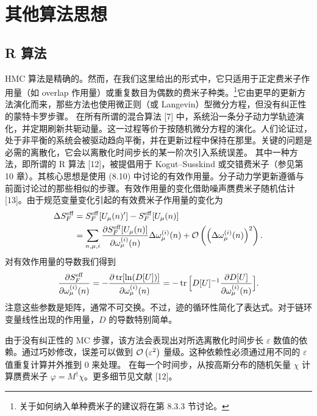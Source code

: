 \section{其他算法思想}

\subsection{R 算法}

HMC 算法是精确的。然而，在我们这里给出的形式中，它只适用于正定费米子作用量（如 overlap 作用量）或重复数目为偶数的费米子种类。\footnote{关于如何纳入单种费米子的建议将在第 8.3.3 节讨论。}它由更早的更新方法演化而来，那些方法也使用微正则（或 Langevin）型微分方程，但没有纠正性的蒙特卡罗步骤。
在所有所谓的混合算法 [7] 中，系统沿一条分子动力学轨迹演化，并定期刷新共轭动量。这一过程等价于按随机微分方程的演化。人们论证过，处于非平衡的系统会被驱动趋向平衡，并在更新过程中保持在那里。关键的问题是必需的离散化，它会以离散化时间步长的某一阶次引入系统误差。
其中一种方法，即所谓的 R 算法 [12]，被提倡用于 Kogut--Susskind 或交错费米子（参见第 10 章）。其核心思想是使用 (8.10) 中讨论的有效作用量。分子动力学更新遵循与前面讨论过的那些相似的步骤。有效作用量的变化借助噪声赝费米子随机估计 [13]。由于规范变量变化引起的有效费米子作用量的变化为
\begin{equation}
\begin{split}
\Delta S_F^{\mathrm{eff}} &= S_F^{\mathrm{eff}}[U_\mu(n)'] - S_F^{\mathrm{eff}}[U_\mu(n)]\\
&= \sum_{n,\mu,i}\frac{\partial S_F^{\mathrm{eff}}[U_\mu(n)]}{\partial\omega_\mu^{(i)}(n)}
   \Delta\omega_\mu^{(i)}(n)
   + \mathcal{O}\left(\Big(\Delta\omega_\mu^{(i)}(n)\Big)^2\right).
\end{split}
\end{equation}
对有效作用量的导数我们得到
\begin{equation}
\frac{\partial S_F^{\mathrm{eff}}}{\partial\omega_\mu^{(i)}(n)}
= -\frac{\partial\operatorname{tr}[\ln(D[U])]}{\partial\omega_\mu^{(i)}(n)}
= -\operatorname{tr}\Big[D[U]^{-1}\frac{\partial D[U]}{\partial\omega_\mu^{(i)}(n)}\Big].
\end{equation}
注意这些参数是矩阵，通常不可交换。不过，迹的循环性简化了表达式。对于链环变量线性出现的作用量，$D$ 的导数特别简单。

由于没有纠正性的 MC 步骤，该方法会表现出对所选离散化时间步长 $\varepsilon$ 数值的依赖。通过巧妙修改，误差可以做到 $\mathcal{O}\left(\varepsilon^2\right)$ 量级。这种依赖性必须通过用不同的 $\varepsilon$ 值重复计算并外推到 0 来处理。
在每一个时间步，从按高斯分布的随机矢量 $\chi$ 计算赝费米子 $\varphi = M^\dagger\chi$。更多细节见文献 [12]。

